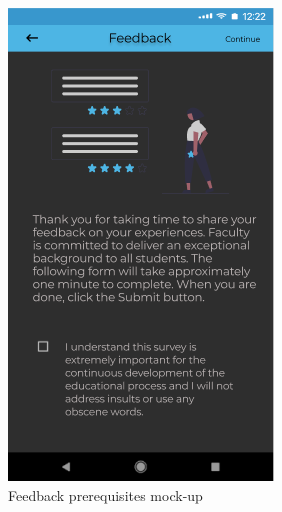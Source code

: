     \begin{figure}[!ht]
        \centering
        \begin{minipage}[b]{0.32\textwidth}
            \captionsetup{justification=centering}
            \includegraphics[width=\textwidth]{figures/app/initial/prerequisites.png}
            \caption{Feedback prerequisites mock-up}
            \label{4:fig:figma_prerequisites}
        \end{minipage}
        \hfill
        \begin{minipage}[b]{0.318\textwidth}

\end{minipage}
\end{figure}
